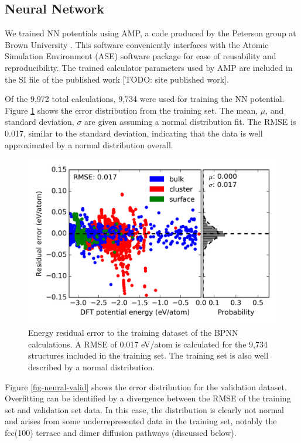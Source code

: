\documentclass[12pt]{cmuthesis}
\begin{document}
\subsection{Neural Network}
\label{sec:orgf5ba73a}
We trained NN potentials using AMP, a code produced by the Peterson group at Brown University \cite{khorshidi-2016-amp}. This software conveniently interfaces with the Atomic Simulation Environment (ASE) software package \cite{khorshidi-2016-amp} for ease of reusability and reproducibility. The trained calculator parameters used by AMP are included in the SI file of the published work [TODO: site published work].

Of the 9,972 total calculations, 9,734 were used for training the NN potential. Figure \ref{fig-neural-train} shows the error distribution from the training set. The mean, \(\mu\), and standard deviation, \(\sigma\) are given assuming a normal distribution fit. The RMSE is 0.017, similar to the standard deviation, indicating that the data is well approximated by a normal distribution overall.

\begin{figure}[h]
\centering
\includegraphics[width=5in]{./images/fig-neural-train.png}
\caption{\label{fig-neural-train}
Energy residual error to the training dataset of the BPNN calculations. A RMSE of 0.017 eV/atom is calculated for the 9,734 structures included in the training set. The training set is also well described by a normal distribution.}
\end{figure}

Figure \ref{fig-neural-valid} shows the error distribution for the validation dataset. Overfitting can be identified by a divergence between the RMSE of the training set and validation set data. In this case, the distribution is clearly not normal and arises from some underrepresented data in the training set, notably the fcc(100) terrace and dimer diffusion pathways (discussed below).
\end{document}
